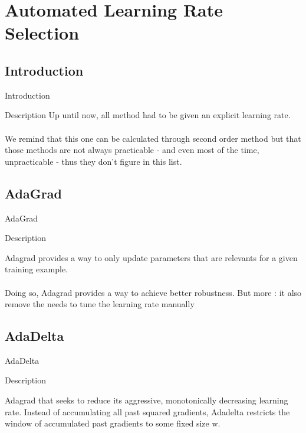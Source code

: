 \documentclass{beamer}
\begin{document}

\section{Automated Learning Rate Selection}

\subsection{Introduction}

\begin{frame}{Introduction}
\begin{block}{Description}
Up until now, all method had to be given an explicit learning rate. \\~\\

We remind that this one can be calculated through second order method but that those methods are not always practicable - and even most of the time, unpracticable - thus they don't figure in this list. 
\end{block}

\end{frame}


\subsection{AdaGrad}

\begin{frame}{AdaGrad}
\begin{block}{Description}

Adagrad provides a way to only update parameters that are relevants for a given training example.\\~\\

Doing so, Adagrad provides a way to achieve better robustness. But more : it also remove the needs to tune the learning rate manually
\end{block}

\end{frame}


\subsection{AdaDelta}

\begin{frame}{AdaDelta}
\begin{block}{Description}

Adagrad that seeks to reduce its aggressive, monotonically decreasing learning rate. Instead of accumulating all past squared gradients, Adadelta restricts the window of accumulated past gradients to some fixed size w.
\\~\\
\end{block}
\end{frame}
\end{document}
